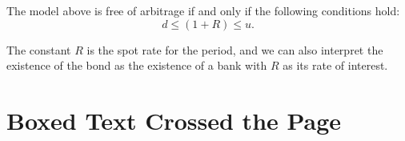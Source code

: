 \documentclass{Base}
\begin{document}
\begin{nota}
The model above is free of arbitrage if and only if the following
conditions hold:
\begin{equation}\label{noarb}
d \leq (1+R) \leq u.
\end{equation}
\end{nota}

\begin{Exercises}
The constant $R$ is the spot rate for the period, and we can
also interpret the existence of the bond as the existence of a
bank with $R$ as its rate of interest.
\end{Exercises}

\section*{Boxed Text Crossed the Page}
\end{document}
